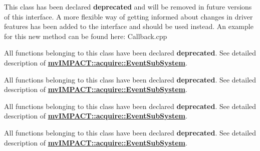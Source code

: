 \begin{DoxyRefList}
\item[\label{deprecated__deprecated000013}%
\hypertarget{deprecated__deprecated000013}{}%
类 \hyperlink{classmv_i_m_p_a_c_t_1_1acquire_1_1_event_sub_system}{mv\+I\+M\+P\+A\+C\+T\+:\+:acquire\+:\+:Event\+Sub\+System} ]This class has been declared {\bfseries deprecated} and will be removed in future versions of this interface. A more flexible way of getting informed about changes in driver features has been added to the interface and should be used instead. An example for this new method can be found here\+: Callback.\+cpp 
\item[\label{deprecated__deprecated000029}%
\hypertarget{deprecated__deprecated000029}{}%
成员 \hyperlink{group___device_specific_interface_gadb3fa35ca8658058536b71acba5934bf}{mv\+I\+M\+P\+A\+C\+T\+:\+:acquire\+:\+:Event\+Sub\+System\+:\+:Event\+Sub\+System} (const Event\+Sub\+System \&src)]All functions belonging to this class have been declared {\bfseries deprecated}. See detailed description of {\bfseries \hyperlink{classmv_i_m_p_a_c_t_1_1acquire_1_1_event_sub_system}{mv\+I\+M\+P\+A\+C\+T\+::acquire\+::\+Event\+Sub\+System}}. 
\item[\label{deprecated__deprecated000032}%
\hypertarget{deprecated__deprecated000032}{}%
成员 \hyperlink{classmv_i_m_p_a_c_t_1_1acquire_1_1_event_sub_system_a523c894cbe15b257cf14ec3050e88919}{mv\+I\+M\+P\+A\+C\+T\+:\+:acquire\+:\+:Event\+Sub\+System\+:\+:get\+Event\+By\+Index} (int index) const ]All functions belonging to this class have been declared {\bfseries deprecated}. See detailed description of {\bfseries \hyperlink{classmv_i_m_p_a_c_t_1_1acquire_1_1_event_sub_system}{mv\+I\+M\+P\+A\+C\+T\+::acquire\+::\+Event\+Sub\+System}}. 
\item[\label{deprecated__deprecated000034}%
\hypertarget{deprecated__deprecated000034}{}%
成员 \hyperlink{classmv_i_m_p_a_c_t_1_1acquire_1_1_event_sub_system_a9d73c821084f1376e221191cf4efaa57}{mv\+I\+M\+P\+A\+C\+T\+:\+:acquire\+:\+:Event\+Sub\+System\+:\+:get\+Event\+By\+Name} (const std\+::string \&name) const ]All functions belonging to this class have been declared {\bfseries deprecated}. See detailed description of {\bfseries \hyperlink{classmv_i_m_p_a_c_t_1_1acquire_1_1_event_sub_system}{mv\+I\+M\+P\+A\+C\+T\+::acquire\+::\+Event\+Sub\+System}}. 
\item[\label{deprecated__deprecated000033}%
\hypertarget{deprecated__deprecated000033}{}%
成员 \hyperlink{classmv_i_m_p_a_c_t_1_1acquire_1_1_event_sub_system_a1fd518a1695f14d8963f7bad4084f473}{mv\+I\+M\+P\+A\+C\+T\+:\+:acquire\+:\+:Event\+Sub\+System\+:\+:get\+Event\+By\+Type} (T\+Device\+Event\+Type type) const ]All functions belonging to this class have been declared {\bfseries deprecated}. See detailed description of {\bfseries \hyperlink{classmv_i_m_p_a_c_t_1_1acquire_1_1_event_sub_system}{mv\+I\+M\+P\+A\+C\+T\+::acquire\+::\+Event\+Sub\+System}}. 

\end{DoxyRefList}

